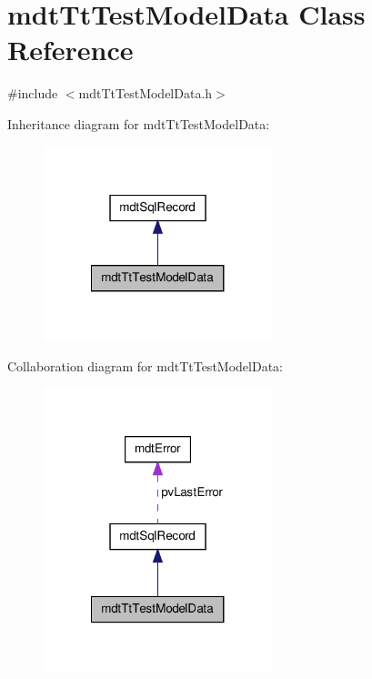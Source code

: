 \hypertarget{classmdt_tt_test_model_data}{\section{mdt\-Tt\-Test\-Model\-Data Class Reference}
\label{classmdt_tt_test_model_data}
}


{\ttfamily \#include $<$mdt\-Tt\-Test\-Model\-Data.\-h$>$}



Inheritance diagram for mdt\-Tt\-Test\-Model\-Data\-:\nopagebreak
\begin{figure}[H]
\begin{center}
\leavevmode
\includegraphics[width=188pt]{classmdt_tt_test_model_data__inherit__graph}
\end{center}
\end{figure}


Collaboration diagram for mdt\-Tt\-Test\-Model\-Data\-:\nopagebreak
\begin{figure}[H]
\begin{center}
\leavevmode
\includegraphics[width=188pt]{classmdt_tt_test_model_data__coll__graph}
\end{center}
\end{figure}
